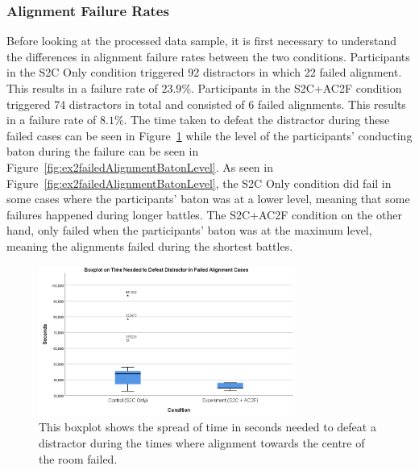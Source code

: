 \subsubsection{Alignment Failure Rates}
Before looking at the processed data sample, it is first necessary to understand the differences in alignment failure rates between the two conditions. Participants in the S2C Only condition triggered 92 distractors in which 22 failed alignment. This results in a failure rate of $23.9\%$. Participants in the S2C+AC2F condition triggered 74 distractors in total and consisted of 6 failed alignments. This results in a failure rate of $8.1\%$. The time taken to defeat the distractor during these failed cases can be seen in Figure~\ref{fig:ex2failedDistractorTimeBoxplot} while the level of the participants' conducting baton during the failure can be seen in Figure~\ref{fig:ex2failedAlignmentBatonLevel}. As seen in Figure~\ref{fig:ex2failedAlignmentBatonLevel}, the S2C Only condition did fail in some cases where the participants' baton was at a lower level, meaning that some failures happened during longer battles. The S2C+AC2F condition on the other hand, only failed when the participants' baton was at the maximum level, meaning the alignments failed during the shortest battles. 

\begin{figure}[tbph]
    \centering
    \includegraphics[width=0.75\textwidth]{figures/graphs/failureDistractorDefeatTimeBoxplot.png}
    \caption[Boxplot on Time Needed to Defeat Distractor During Failed Alignments]{This boxplot shows the spread of time in seconds needed to defeat a distractor during the times where alignment towards the centre of the room failed.}
    \label{fig:ex2failedDistractorTimeBoxplot}
\end{figure}

